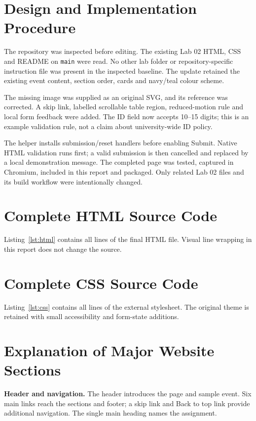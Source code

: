 \documentclass[11pt,a4paper]{article}
\begin{document}
\section{Design and Implementation Procedure}
The repository was inspected before editing. The existing Lab 02 HTML, CSS and README on \texttt{main} were read. No other lab folder or repository-specific instruction file was present in the inspected baseline. The update retained the existing event content, section order, cards and navy/teal colour scheme.

The missing image was supplied as an original SVG, and its reference was corrected. A skip link, labelled scrollable table region, reduced-motion rule and local form feedback were added. The ID field now accepts 10--15 digits; this is an example validation rule, not a claim about university-wide ID policy.

The helper installs submission/reset handlers before enabling Submit. Native HTML validation runs first; a valid submission is then cancelled and replaced by a local demonstration message. The completed page was tested, captured in Chromium, included in this report and packaged. Only related Lab 02 files and its build workflow were intentionally changed.

\clearpage
\section{Complete HTML Source Code}
Listing~\ref{lst:html} contains all \HTMLLines{} lines of the final HTML file. Visual line wrapping in this report does not change the source.

\clearpage
\section{Complete CSS Source Code}
Listing~\ref{lst:css} contains all \CSSLines{} lines of the external stylesheet. The original theme is retained with small accessibility and form-state additions.


\clearpage
\section{Explanation of Major Website Sections}
\textbf{Header and navigation.} The header introduces the page and sample event. Six main links reach the sections and footer; a skip link and Back to top link provide additional navigation. The single main heading names the assignment.
\end{document}
